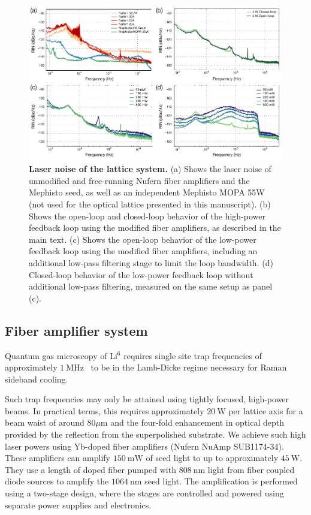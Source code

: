 \documentclass[twocolumn,aps,pra,showpacs,preprintnumbers,bibnotes]{revtex4-1}
\newcommand\unit[2]{\ensuremath{#1~\mathrm{{#2}}}}
\begin{document}
\begin{figure}
  \begin{center}
    \includegraphics{Figure2.pdf}
    \caption{\textbf{Laser noise of the lattice system.} (a) Shows the laser noise of unmodified and free-running Nufern fiber amplifiers and the Mephisto seed, as well as an independent Mephisto MOPA 55W (not used for the optical lattice presented in this manuscript). (b) Shows the open-loop and closed-loop behavior of the high-power feedback loop using the  modified fiber amplifiers, as described in the main text. (c) Shows the open-loop behavior of the low-power feedback loop using the modified fiber amplifiers, including an additional low-pass filtering stage to limit the loop bandwidth. (d) Closed-loop behavior of the low-power feedback loop without additional low-pass filtering, measured on the same setup as panel (c).}\label{fig:noises}
  \end{center}
\end{figure}

\subsection{Fiber amplifier system}
Quantum gas microscopy of Li$^6$ requires single site trap frequencies of approximately \unit{1}{MHz}~\cite{Parsons2015} to be in the Lamb-Dicke regime necessary for Raman sideband cooling.

Such trap frequencies may only be attained using tightly focused, high-power beams.
In practical terms, this requires approximately \unit{20}{W} per lattice axis for a beam waist of around $80 \mu\mathrm{m}$ and the four-fold enhancement in optical depth provided by the reflection from the superpolished substrate. We achieve such high laser powers using Yb-doped fiber amplifiers (Nufern NuAmp SUB1174-34).
These amplifiers can amplify \unit{150}{mW} of seed light to up to approximately \unit{45}{W}. They use a length of doped fiber pumped with \unit{808}{nm} light from fiber coupled diode sources to amplify the \unit{1064}{nm} seed light.
The amplification is performed using a two-stage design, where the stages are controlled and powered using separate power supplies and electronics.
\end{document}
